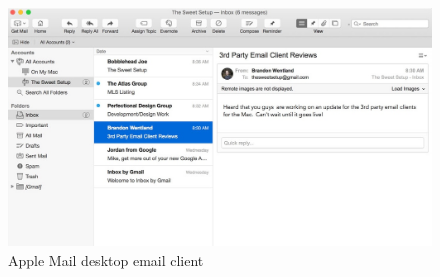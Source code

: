 \documentclass{l4proj}
\begin{document}
\begin{appendices}
\begin{figure}
    \includegraphics[width=1.1\linewidth]{images/applemail.png}
    \caption{Apple Mail desktop email client}
    \label{fig:applemail}
\end{figure}


\end{appendices}






\end{document}
